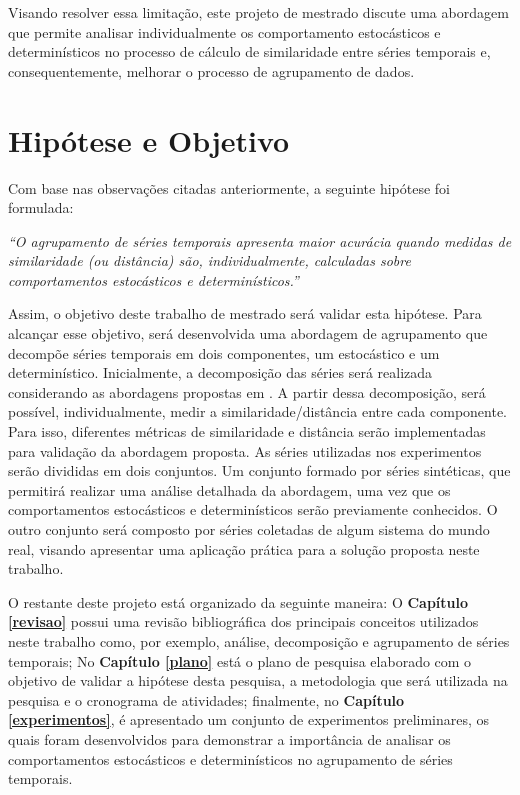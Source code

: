 \documentclass[qual, classic, a4paper]{ufbathesis}
\begin{document}
Visando resolver essa limitação, este projeto de mestrado discute uma abordagem que permite analisar individualmente os comportamento estocásticos e determinísticos no processo de cálculo de similaridade entre séries temporais e, consequentemente, melhorar o processo de agrupamento de dados.

\section{Hipótese e Objetivo}

Com base nas observações citadas anteriormente, a seguinte hipótese foi formulada:

\begin{center}
\textit{``O agrupamento de séries temporais apresenta maior acurácia quando medidas de similaridade (ou distância) são, individualmente, calculadas sobre comportamentos estocásticos e determinísticos.''}
\end{center}

Assim, o objetivo deste trabalho de mestrado será validar esta hipótese. Para alcançar esse objetivo, será desenvolvida uma abordagem de agrupamento que decompõe séries temporais em dois componentes, um estocástico e um determinístico. Inicialmente, a decomposição das séries será realizada considerando as abordagens propostas em . A partir dessa decomposição, será possível, individualmente, medir a similaridade/distância entre cada componente. Para isso, diferentes métricas de similaridade e distância serão implementadas para validação da abordagem proposta. As séries utilizadas nos experimentos serão divididas em dois conjuntos. Um conjunto formado por séries sintéticas, que permitirá realizar uma análise detalhada da abordagem, uma vez que os comportamentos estocásticos e determinísticos serão previamente conhecidos. O outro conjunto será composto por séries coletadas de algum sistema do mundo real, visando apresentar uma aplicação prática para a solução proposta neste trabalho.

O restante deste projeto  está organizado da seguinte maneira: O \textbf{Capítulo \ref{revisao}} possui uma revisão bibliográfica dos principais conceitos utilizados neste trabalho como, por exemplo, análise, decomposição e agrupamento de séries temporais; No \textbf{Capítulo \ref{plano}} está o plano de pesquisa elaborado com o objetivo de validar a hipótese desta pesquisa, a metodologia que será utilizada na pesquisa e o cronograma de atividades; finalmente, no \textbf{Capítulo \ref{experimentos}}, é apresentado um conjunto de experimentos preliminares, os quais foram desenvolvidos para demonstrar a importância de analisar os comportamentos estocásticos e determinísticos no agrupamento de séries temporais.
\end{document}
